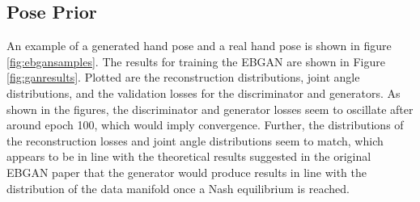 \documentclass[10pt,twocolumn,letterpaper]{article}
\begin{document}
\subsection{Pose Prior}
An example of a generated hand pose and a real hand pose is shown in figure \ref{fig:ebgansamples}. The results for training the EBGAN are shown in Figure \ref{fig:ganresults}. Plotted are the reconstruction distributions, joint angle distributions, and the validation losses for the discriminator and generators. As shown in the figures, the discriminator and generator losses seem to oscillate after around epoch 100, which would imply convergence. Further, the distributions of the reconstruction losses and joint angle distributions seem to match, which appears to be in line with the theoretical results suggested in the original EBGAN paper that the generator would produce results in line with the distribution of the data manifold once a Nash equilibrium is reached. 
\end{document}
